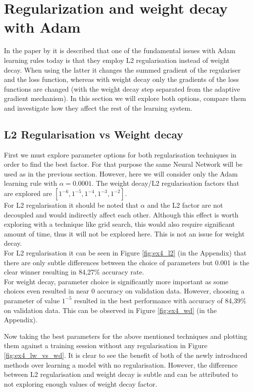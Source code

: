\documentclass{article}
\begin{document}
\section{Regularization and weight decay with Adam}

In the paper by \citeauthor{loshchilov2018fixing} it is described that one of the fundamental issues with Adam learning rules today is that they employ L2 regularisation instead of weight decay. When using the latter it changes the summed gradient of the regulariser and the loss function, whereas with weight decay only the gradients of the loss functions are changed (with the weight decay step separated from the
adaptive gradient mechanism). In this section we will explore both options, compare them and investigate how they affect the rest of the learning system.

\subsection{L2 Regularisation vs Weight decay}
First we must explore parameter options for both regularisation techniques in order to find the best factor. For that purpose the same Neural Network will be used as in the previous section. However, here we will consider only the Adam learning rule with $\alpha = 0.0001$. The weight decay/L2 regularisation factors that are explored are $[1^{-6}, 1^{-5}, 1^{-4}, 1^{-3}, 1^{-2}]$.
\\
For L2 regularisation it should be noted that $\alpha$ and the L2 factor are not decoupled and would indirectly affect each other. Although this effect is worth exploring with a technique like grid search, this would also require significant amount of time, thus it will not be explored here. This is not an issue for weight decay.
\\
For L2 regularisation it can be seen in Figure \ref{fig:ex4_l2} (in the Appendix) that there are only subtle differences between the choice of parameters but 0.001 is the clear winner resulting in 84,27\% accuracy rate.
\\
For weight decay, parameter choice is significantly more important as some choices even resulted in near 0 accuracy on validation data. However, choosing a parameter of value $1^{-5}$ resulted in the best performance with accuracy of 84,39\% on validation data. This can be observed in Figure \ref{fig:ex4_wd} (in the Appendix).

Now taking the best parameters for the above mentioned techniques and plotting them against a training session without any regularisation in Figure \ref{fig:ex4_lw_vs_wd}. It is clear to see the benefit of both of the newly introduced methods over learning a model with no regularisation. However, the difference between L2 regularisation and weight decay is subtle and can be attributed to not exploring enough values of weight decay factor. 
\end{document}
